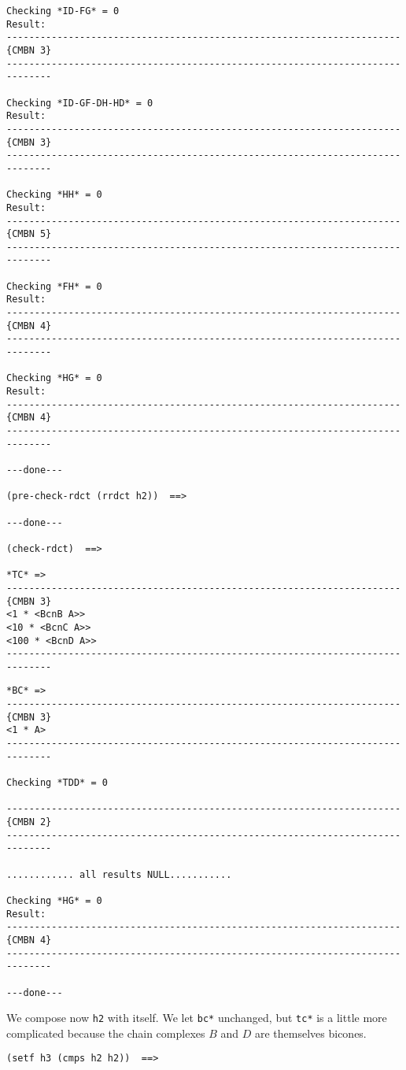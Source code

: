 {{\begin{verbatim}
Checking *ID-FG* = 0
Result:
----------------------------------------------------------------------{CMBN 3}
------------------------------------------------------------------------------

Checking *ID-GF-DH-HD* = 0
Result:
----------------------------------------------------------------------{CMBN 3}
------------------------------------------------------------------------------

Checking *HH* = 0
Result:
----------------------------------------------------------------------{CMBN 5}
------------------------------------------------------------------------------

Checking *FH* = 0
Result:
----------------------------------------------------------------------{CMBN 4}
------------------------------------------------------------------------------

Checking *HG* = 0
Result:
----------------------------------------------------------------------{CMBN 4}
------------------------------------------------------------------------------

---done---

(pre-check-rdct (rrdct h2))  ==>

---done---

(check-rdct)  ==>

*TC* =>
----------------------------------------------------------------------{CMBN 3}
<1 * <BcnB A>>
<10 * <BcnC A>>
<100 * <BcnD A>>
------------------------------------------------------------------------------
\end{verbatim}}
\newpage
{\footnotesize \begin{verbatim}
*BC* =>
----------------------------------------------------------------------{CMBN 3}
<1 * A>
------------------------------------------------------------------------------

Checking *TDD* = 0

----------------------------------------------------------------------{CMBN 2}
------------------------------------------------------------------------------

............ all results NULL...........

Checking *HG* = 0
Result:
----------------------------------------------------------------------{CMBN 4}
------------------------------------------------------------------------------

---done---
\end{verbatim}}
We compose now {\tt h2} with itself. We let {\tt *bc*} unchanged, but {\tt *tc*}
is a little more complicated because the chain complexes $B$ and $D$  are themselves  bicones.
{\footnotesize\begin{verbatim}
(setf h3 (cmps h2 h2))  ==>


\end{verbatim}}}
